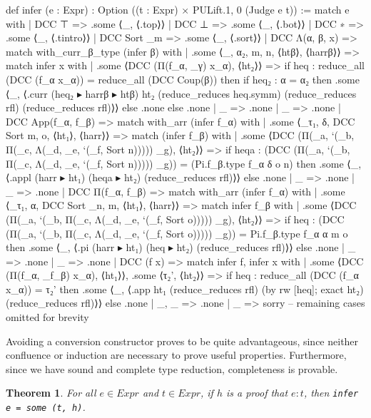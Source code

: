\documentclass{article}
\newtheorem{theorem}{Theorem}
\begin{document}
\begin{leancode}
def infer (e : Expr) : Option ((t : Expr) × PULift.{1, 0} (Judge e t)) :=
  match e with
  | DCC ⊤ => .some ⟨_, ⟨.top⟩⟩
  | DCC ⊥ => .some ⟨_, ⟨.bot⟩⟩
  | DCC ∗ => .some ⟨_, ⟨.tintro⟩⟩
  | DCC Sort _m => .some ⟨_, ⟨.sort⟩⟩
  | DCC Λ(α, β, x) =>
    match with_curr_β_type (infer β) with
    | .some ⟨_, α₂, m, n, ⟨htβ⟩, ⟨harrβ⟩⟩ =>
      match infer x with
      | .some ⟨DCC (Π(f_α, _γ) x_α), ⟨ht₂⟩⟩ =>
        if heq : reduce_all (DCC (f_α x_α)) = reduce_all (DCC Coup(β)) then
          if heq₂ : α = α₂ then
            .some ⟨_, ⟨.curr (heq₂ ▸ harrβ ▸ htβ) ht₂ (reduce_reduces heq.symm)
              (reduce_reduces rfl)
              (reduce_reduces rfl)⟩⟩
          else .none
        else .none
      | _ => .none
    | _ => .none
  | DCC App(f_α, f_β) =>
    match with_arr (infer f_α) with
    | .some ⟨_τ₁, δ, DCC Sort m, o, ⟨ht₁⟩, ⟨harr⟩⟩ =>
      match (infer f_β) with
      | .some ⟨DCC (Π(_a, `(_b, Π(_c, Λ(_d, _e, `(_f, Sort n))))) _g), ⟨ht₂⟩⟩ =>
        if heqa : (DCC (Π(_a, `(_b, Π(_c, Λ(_d, _e, `(_f, Sort n))))) _g)) = (Pi.f_β.type f_α δ o n) then
          .some ⟨_, ⟨.appl (harr ▸ ht₁) (heqa ▸ ht₂) (reduce_reduces rfl)⟩⟩
        else .none
      | _ => .none
    | _ => .none
  | DCC Π(f_α, f_β) =>
    match with_arr (infer f_α) with
    | .some ⟨_τ₁, α, DCC Sort _n, m, ⟨ht₁⟩, ⟨harr⟩⟩ =>
      match infer f_β with
      | .some ⟨DCC (Π(_a, `(_b, Π(_c, Λ(_d, _e, `(_f, Sort o))))) _g), ⟨ht₂⟩⟩ =>
        if heq : (DCC (Π(_a, `(_b, Π(_c, Λ(_d, _e, `(_f, Sort o))))) _g)) = Pi.f_β.type f_α α m o then
          .some ⟨_, ⟨.pi (harr ▸ ht₁) (heq ▸ ht₂) (reduce_reduces rfl)⟩⟩
        else .none
      | _ => .none
    | _ => .none
  | DCC (f x) =>
    match infer f, infer x with
    | .some ⟨DCC (Π(f_α, _f_β) x_α), ⟨ht₁⟩⟩, .some ⟨τ₂', ⟨ht₂⟩⟩ =>
      if heq : reduce_all (DCC (f_α x_α)) = τ₂' then
        .some ⟨_, ⟨.app ht₁ (reduce_reduces rfl) (by rw [heq]; exact ht₂) (reduce_reduces rfl)⟩⟩
      else .none
    | _, _ => .none
  | _ => sorry -- remaining cases omitted for brevity
\end{leancode}

Avoiding a conversion constructor proves to be quite advantageous, since neither confluence or induction are necessary to prove useful properties. Furthermore, since we have sound and complete type reduction, completeness is provable.

\begin{theorem}
  For all \(e \in Expr\) and \(t \in Expr\), if \(h\) is a proof that \(e : t\), then \texttt{infer e = some (t, h)}.
\end{theorem}
\end{document}
